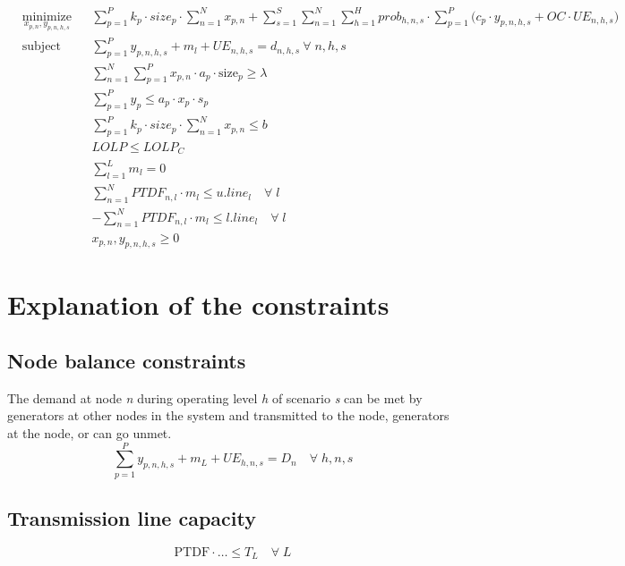 \documentclass[10pt]{amsart}
\begin{document}
\begin{equation*}
\begin{aligned}
& \underset{x_{p,n}, y_{p,n,h,s}}{\text{minimize}} & & \sum_{p=1}^{P} k_{p}\cdot size_{p}\cdot \sum_{n=1}^{N} x_{p,n} + \sum_{s=1}^{S} \sum_{n=1}^{N} \sum_{h=1}^{H} prob_{h,n,s} \cdot \sum_{p=1}^{P} \Big(c_{p}\cdot y_{p,n,h,s} + \textit{OC} \cdot \textit{UE}_{n,h,s} \Big)\\
& \text{subject to} & & \sum_{p=1}^{P} y_{p,n,h,s} + m_{l} + \textit{UE}_{n,h,s} = d_{n,h,s} \ \forall \; n,h,s \\
& && \sum_{n=1}^{N}\sum_{p=1}^{P} x_{p,n} \cdot a_{p} \cdot \text{size}_{p} \geq \lambda \\
& &&\sum_{p=1}^{P} y_{p} \leq a_{p}\cdot x_{p}\cdot s_{p}\\
& &&\sum_{p=1}^{P} k_{p} \cdot size_{p} \cdot \sum_{n=1}^{N} x_{p,n} \leq b \\
& &&LOLP \leq LOLP_{C} \\
& &&\sum_{l=1}^{L} m_{l} = 0 \\ 
& &&\sum_{n=1}^{N} \textit{PTDF}_{n,l} \cdot m_{l} \leq \textit{u.line}_{l} \quad \forall \; l \\
& &&-\sum_{n=1}^{N} \textit{PTDF}_{n,l} \cdot m_{l} \leq \textit{l.line}_{l} \quad \forall \; l \\
& && x_{p,n}, y_{p,n,h,s} \geq 0
\end{aligned}
\end{equation*}

\section{Explanation of the constraints}
\subsection{Node balance constraints}
The demand at node \textit{n} during operating level \textit{h} of scenario \textit{s} can be met by generators at other nodes in the system and transmitted to the node, generators at the node, or can go unmet. 
\begin{equation}
\sum_{p=1}^{P} y_{p,n,h,s} + m_{L} + \textit{UE}_{h,n,s}= D_{n} \quad \forall \; h,n,s
\end{equation}
\subsection{Transmission line capacity}
\begin{equation}
\text{PTDF}\cdot \ldots \leq T_{L} \quad \forall \; L
\end{equation}
\end{document}
